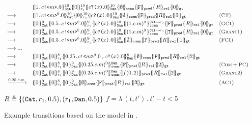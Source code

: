 \begin{figure}[t]
{\footnotesize
\[
\begin{array}{lll}
&
\pcell{\qsend{1}{c}{m}.0}{10}{\cn{Cat}}
\pcell{0}{10}{r_1}
\pcell{\qrev{c}{x}.0}{10}{\cn{Dan}} 
\qcell{\emptyset}{\cn{comm}}
\qcell{\texttt{F}}{\cn{pred}}
\qcell{R}{\cn{rel}}
\qcell{0}{\cn{gt}}
&
\\[0.3em]
\longrightarrow
&
\pcell{\qsend{1}{c}{m}^0.0}{10}{\cn{Cat}}
\pcell{0}{10}{r_1}
\pcell{\qrev{c}{x}.0}{10}{\cn{Dan}} 
\qcell{\emptyset}{\cn{comm}}
\qcell{\texttt{F}}{\cn{pred}}
\qcell{R}{\cn{rel}}
\qcell{0}{\cn{gt}}
&
(\rulelab{CT})
\\[0.3em]
\longrightarrow
&
\pcell{0}{9}{\cn{Cat}}
\pcell{\qsend{0.5}{c}{m}^0.0}{9}{r_1}
\pcell{\qrev{c}{x}.0}{10}{\cn{Dan}} 
\pcell{(1.c.m)^0}{\cn{Cat}\rightarrow r_1}{\cn{comm}}
\qcell{\texttt{F}}{\cn{pred}}
\qcell{R}{\cn{rel}}
\qcell{0}{\cn{gt}}
&
(\rulelab{GC1})
\\[0.3em]
\longrightarrow
&
\pcell{0}{9}{\cn{Cat}}
\pcell{\qsend{0.5}{c}{m}^0.0}{9}{r_1}
\pcell{\qrev{c}{x}.0}{10}{\cn{Dan}} 
\pcell{(1.c.m)^0}{\cn{Cat}\rightarrow r_1}{\cn{comm}}
\qcell{\texttt{T}}{\cn{pred}}
\qcell{R}{\cn{rel}}
\qcell{0}{\cn{gt}}
&
(\rulelab{Grant1})
\\[0.3em]
\longrightarrow
&
\pcell{0}{9}{\cn{Cat}}
\pcell{\qsend{0.5}{c}{m}^0.0}{9}{r_1}
\pcell{\qrev{c}{x}.0}{10}{\cn{Dan}} 
\qcell{\emptyset}{\cn{comm}}
\qcell{\texttt{F}}{\cn{pred}}
\qcell{R}{\cn{rel}}
\qcell{1}{\cn{gt}}
&
(\rulelab{FC1})
\\[0.3em]
\longrightarrow ...
\\[0.3em]
\longrightarrow
&
\pcell{0}{9}{\cn{Cat}}
\pcell{0}{8}{r_1}
\pcell{\pard{\qsend{0.25}{c}{m}^0.0}{\qrev{c}{x}.0}}{9}{\cn{Dan}} 
\qcell{\emptyset}{\cn{comm}}
\qcell{\texttt{F}}{\cn{pred}}
\qcell{R}{\cn{rel}}
\qcell{2}{\cn{gt}}
&
\\[0.3em]
\longrightarrow
&
\pcell{0}{9}{\cn{Cat}}
\pcell{0}{8}{r_1}
\pcell{0}{9}{\cn{Dan}} 
\pcell{(0.25.c.m)^0}{\cn{Dan}}{\cn{comm}}
\qcell{\texttt{F}}{\cn{pred}}
\qcell{R}{\cn{rel}}
\qcell{2}{\cn{gt}}
&
(\rulelab{Com}+\rulelab{PC})
\\[0.3em]
\longrightarrow
&
\pcell{0}{9}{\cn{Cat}}
\pcell{0}{8}{r_1}
\pcell{0}{9}{\cn{Dan}} 
\pcell{(0.25.c.m)^0}{\cn{Dan}}{\cn{comm}}
\qcell{f(0,2)}{\cn{pred}}
\qcell{R}{\cn{rel}}
\qcell{2}{\cn{gt}}
&
(\rulelab{Grant2})
\\[0.3em]
\xrightarrow{0.25.c.m}&
\pcell{0}{9}{\cn{Cat}}
\pcell{0}{8}{r_1}
\pcell{0}{9}{\cn{Dan}} 
\qcell{\emptyset}{\cn{comm}}
\qcell{\texttt{F}}{\cn{pred}}
\qcell{R}{\cn{rel}}
\qcell{3}{\cn{gt}}
&
(\rulelab{AC1})
\end{array}
\]
}
{\footnotesize
\begin{center}
$R\triangleq\{(\texttt{Cat},r_1,0.5), (r_1,\texttt{Dan},0.5)\}$
\qquad
$f=\lambda\,(t,t')\,.\,t'-t<5$
\end{center}
}
\caption{Example transitions based on the model in .}
  \label{fig:q-pi-example1}
\end{figure}



